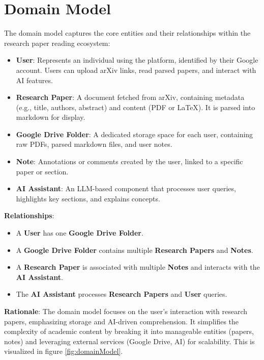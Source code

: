 \documentclass[12pt]{article}
\begin{document}
\section{Domain Model}
The domain model captures the core entities and their relationships within the research paper reading ecosystem:

\begin{itemize}
  \item \textbf{User}: Represents an individual using the platform, identified by their Google account. Users can upload arXiv links, read parsed papers, and interact with AI features.
  \item \textbf{Research Paper}: A document fetched from arXiv, containing metadata (e.g., title, authors, abstract) and content (PDF or LaTeX). It is parsed into markdown for display.
  \item \textbf{Google Drive Folder}: A dedicated storage space for each user, containing raw PDFs, parsed markdown files, and user notes.
  \item \textbf{Note}: Annotations or comments created by the user, linked to a specific paper or section.
  \item \textbf{AI Assistant}: An LLM-based component that processes user queries, highlights key sections, and explains concepts.
\end{itemize}

\textbf{Relationships}:
\begin{itemize}
  \item A \textbf{User} has one \textbf{Google Drive Folder}.
  \item A \textbf{Google Drive Folder} contains multiple \textbf{Research Papers} and \textbf{Notes}.
  \item A \textbf{Research Paper} is associated with multiple \textbf{Notes} and interacts with the \textbf{AI Assistant}.
  \item The \textbf{AI Assistant} processes \textbf{Research Papers} and \textbf{User} queries.
\end{itemize}

\textbf{Rationale}: The domain model focuses on the user's interaction with research papers, emphasizing storage and AI-driven comprehension. It simplifies the complexity of academic content by breaking it into manageable entities (papers, notes) and leveraging external services (Google Drive, AI) for scalability. This is visualized in figure \ref{fig:domainModel}.
\end{document}
